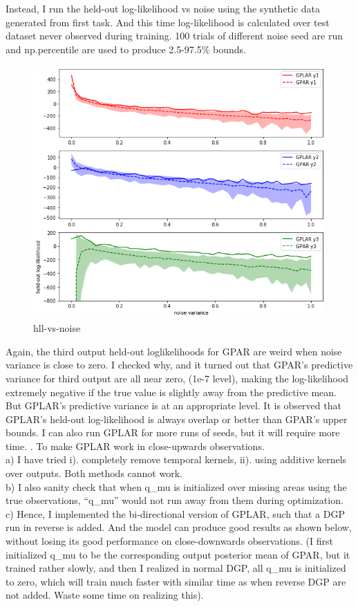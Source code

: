 \documentclass{article}
\begin{document}
Instead, I run the held-out log-likelihood vs noise using the synthetic data generated from first task. And this time log-likelihood is calculated over test dataset never observed during training. 100 trials of different noise seed are run and np.percentile are used to produce 2.5-97.5\% bounds.

\begin{figure}[H]
\centering
\includegraphics[width=.8\linewidth]{hll.png}
\caption{hll-vs-noise}
\end{figure}

Again, the third output held-out loglikelihoods for GPAR are weird when noise variance is close to zero. I checked why, and it turned out that GPAR’s predictive variance for third output are all near zero, (1e-7 level), making the log-likelihood extremely negative if the true value is slightly away from the predictive mean. But GPLAR’s predictive variance is at an appropriate level. It is observed that GPLAR’s held-out log-likelihood is always overlap or better than GPAR’s upper bounds. I can also run GPLAR for more runs of seeds, but it will require more time.
.	To make GPLAR work in close-upwards observations. \\
a)	I have tried i). completely remove temporal kernels, ii). using additive kernels over outputs. Both methods cannot work. \\
b)	I also sanity check that when q\_mu is initialized over missing areas using the true observations, “q\_mu” would not run away from them during optimization. \\
c)	Hence, I implemented the bi-directional version of GPLAR, such that a DGP run in reverse is added. And the model can produce good results as shown below, without losing its good performance on close-downwards observations. (I first initialized q\_mu to be the corresponding output posterior mean of GPAR, but it trained rather slowly, and then I realized in normal DGP, all q\_mu is initialized to zero, which will train much faster with similar time as when reverse DGP are not added. Waste some time on realizing this).
\end{document}
